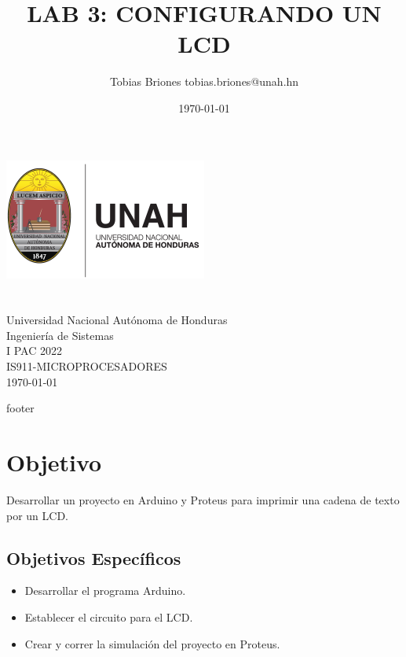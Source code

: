 \documentclass{article}
\title{LAB 3: CONFIGURANDO UN LCD}
\author{Tobias Briones \bigbreak tobias.briones@unah.hn}
\date{\today}
\begin{document}
    \makeatletter
    \begin{titlepage}
        \begin{center}
            \includegraphics[width=0.3\linewidth]{images/logo-unah}\\[4ex]
            {\huge \bfseries \@title
            \vspace{1cm}}\\[2ex]
            {\LARGE \@author}\\[50ex]

            {\large
            Universidad Nacional Autónoma de Honduras\\
            Ingeniería de Sistemas\\
            I PAC 2022\\
            IS911-MICROPROCESADORES
            }\\[2ex]

            {\large \today}
        \end{center}
    \end{titlepage}
    \makeatother
    \thispagestyle{empty}
    \newpage

    {footer}

    \section{Objetivo}

    Desarrollar un proyecto en Arduino y Proteus para imprimir una cadena de
    texto por un LCD\@.

    \subsection{Objetivos Específicos}\label{subsec:objetivos-específicos}

    \begin{itemize}
        \item Desarrollar el programa Arduino.
        \item Establecer el circuito para el LCD.
        \item Crear y correr la simulación del proyecto en Proteus.
    \end{itemize}
\end{document}
